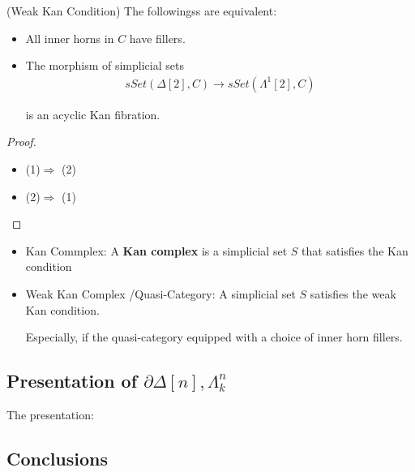 \documentclass[Total.tex]{subfiles}
\begin{document}
				\begin{lemma}
					(Weak Kan Condition) The followingss are equivalent:
					\begin{itemize}
						\item All inner horns in $C$ have fillers. 
						\item The morphism of simplicial sets
						\begin{gather*}
							sSet(\Delta[2],C)\rightarrow sSet(\Lambda^1[2],C)
						\end{gather*}
						
						is an acyclic Kan fibration.
					\end{itemize}
				\end{lemma}
				\begin{proof}
					\begin{itemize}
						\item (1)$\Rightarrow$ (2)
						\item (2)$\Rightarrow$ (1)
					\end{itemize}
				\end{proof}
				
				
				\begin{Def}
					
					\begin{itemize}
						\item Kan Commplex: A \textbf{Kan complex} is a simplicial set $S$ that satisfies the Kan condition
						\item Weak Kan Complex	/Quasi-Category: A simplicial set $S$ satisfies the weak Kan condition.
						
						Especially, if the quasi-category equipped with a choice of inner horn fillers.
					\end{itemize}
				\end{Def}
				
			\subsection{Presentation of $\partial \Delta[n],\Lambda^n_k$}
				The presentation:
				\begin{center}
 				\end{center}
			\subsection{Conclusions}
\end{document}

